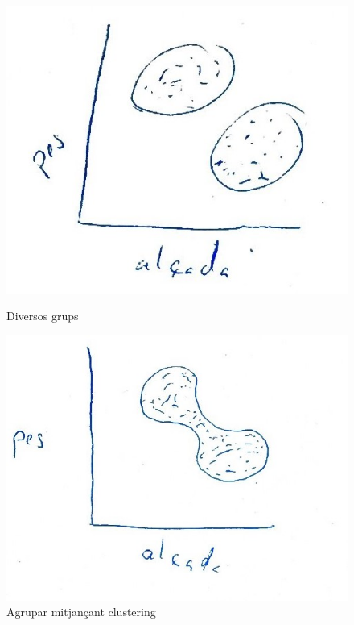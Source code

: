 \begin{figure}[h!]
    \centering
    \begin{minipage}[t]{0.49\textwidth}
        \centering
        \includegraphics[width=\textwidth]{tema_3/images/figura_1}
        \caption{Diversos grups}
    \end{minipage}
    \hfill
    \begin{minipage}[t]{0.49\textwidth}
        \centering
        \includegraphics[width=\textwidth]{tema_3/images/figura_2}
        \caption{Agrupar mitjançant clustering}
    \end{minipage}
\end{figure}

